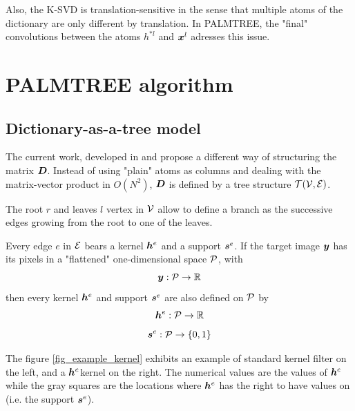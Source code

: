 Also, the K-SVD is translation-sensitive in the sense that multiple atoms of the dictionary are only different by translation. In PALMTREE, the "final" convolutions between the atoms $h^{*l}$ and $\x^l$ adresses this issue.


\section{PALMTREE algorithm}

\subsection{Dictionary-as-a-tree model \label{sec_tree_model}}
The current work, developed in \cite{chabiron_toward_2015} and \cite{chabiron_optimization_2016} propose a different way of structuring the matrix $\D$. Instead of using "plain" atoms as columns and dealing with the matrix-vector product in $O(N^2)$, $\D$ is defined by a tree structure $\T(\V,\E)$. 

The root $r$ and leaves $l$ vertex in $\V$ allow to define a branch as the successive edges growing from the root to one of the leaves.

Every edge $e$ in $\E$ bears a kernel $\h^e$ and a support $\s^e$. If the target image $\y$ has its pixels in a "flattened" one-dimensional space $\P$, with
$$\y : \P \rightarrow \mathbb{R}$$
then every kernel $\h^e$ and support $\s^e$ are also defined on $\P$ by 
$$\h^e:\P \rightarrow \mathbb{R}$$ 
$$\s^e:\P \rightarrow \{0,1\}$$

The figure \ref{fig_example_kernel} exhibits an example of standard kernel filter on the left, and a $\h^e$kernel on the right. The numerical values are the values of $\h^e$ while the gray squares are the locations where $\h^e$ has the right to have values on (i.e. the support $\s^e$).

